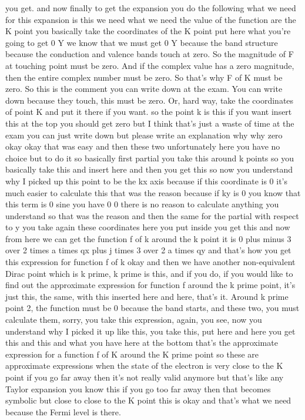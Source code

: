 you get. and now finally to get the expansion you do the following what we need for this expansion is this we need what we need the value of the function are the K point you basically take the coordinates of the K point put here what you're going to get 0 Y we know that we must get 0 Y because the band structure because the conduction and valence bands touch at zero. So the magnitude of F at touching point must be zero. And if the complex value has a zero magnitude, then the entire complex number must be zero. So that's why F of K must be zero. So this is the comment you can write down at the exam. You can write down because they touch, this must be zero. Or, hard way, take the coordinates of point K and put it there if you want. so the point k is this if you want insert this at the top you should get zero but I think that's just a waste of time at the exam you can just write down but please write an explanation why why zero okay okay that was easy and then these two unfortunately here you have no choice but to do it so basically first partial you take this around k points so you basically take this and insert here and then you get this so now you understand why I picked up this point to be the kx axis because if this coordinate is 0 it's much easier to calculate this that was the reason because if ky is 0 you know that this term is 0 sine you have 0 0 there is no reason to calculate anything you understand so that was the reason and then the same for the partial with respect to y you take again these coordinates here you put inside you get this and now from here we can get the function f of k around the k point it is 0 plus minus 3 over 2 times a times qx plus j times 3 over 2 a times qy and that's how you get this expression for function f of k okay and then we have another non-equivalent Dirac point which is k prime, k prime is this, and if you do, if you would like to find out the approximate expression for function f around the k prime point, it's just this, the same, with this inserted here and here, that's it. Around k prime point 2, the function must be 0 because the band starts, and these two, you must calculate them, sorry, you take this expression, again, you see, now you understand why I picked it up like this, you take this, put here and here you get this and this and what you have here at the bottom that's the approximate expression for a function f of K around the K prime point so these are approximate expressions when the state of the electron is very close to the K point if you go far away then it's not really valid anymore but that's like any Taylor expansion you know this if you go too far away then that becomes symbolic but close to close to the K point this is okay and that's what we need because the Fermi level is there.

